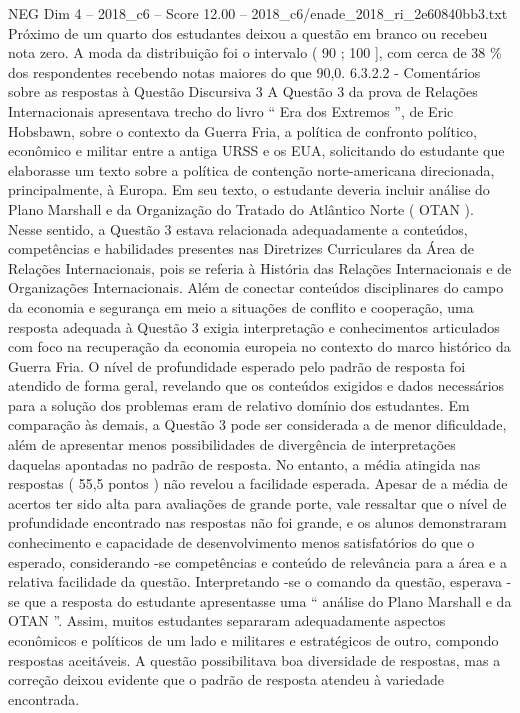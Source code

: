 \begin{textsample}{NEG Dim 4 – 2018\_c6 – Score 12.00 – 2018\_c6/enade\_2018\_ri\_2e60840bb3.txt}
Próximo de um quarto dos estudantes deixou a questão em branco ou recebeu nota zero.
A moda da distribuição foi o intervalo ( 90 ; 100 ], com cerca de 38 \% dos respondentes recebendo notas maiores do que 90,0. 6.3.2.2 - Comentários sobre as respostas à Questão Discursiva 3 A Questão 3 da prova de Relações Internacionais apresentava trecho do livro “ Era dos Extremos ”, de Eric Hobsbawn, sobre o contexto da Guerra Fria, a política de confronto político, econômico e militar entre a antiga URSS e os EUA, solicitando do estudante que elaborasse um texto sobre a política de contenção norte-americana direcionada, principalmente, à Europa.
Em seu texto, o estudante deveria incluir análise do Plano Marshall e da Organização do Tratado do Atlântico Norte ( OTAN ).
Nesse sentido, a Questão 3 estava relacionada adequadamente a conteúdos, competências e habilidades presentes nas Diretrizes Curriculares da Área de Relações Internacionais, pois se referia à História das Relações Internacionais e de Organizações Internacionais.
Além de conectar conteúdos disciplinares do campo da economia e segurança em meio a situações de conflito e cooperação, uma resposta adequada à Questão 3 exigia interpretação e conhecimentos articulados com foco na recuperação da economia europeia no contexto do marco histórico da Guerra Fria.
O nível de profundidade esperado pelo padrão de resposta foi atendido de forma geral, revelando que os conteúdos exigidos e dados necessários para a solução dos problemas eram de relativo domínio dos estudantes.
Em comparação às demais, a Questão 3 pode ser considerada a de menor dificuldade, além de apresentar menos possibilidades de divergência de interpretações daquelas apontadas no padrão de resposta.
No entanto, a média atingida nas respostas ( 55,5 pontos ) não revelou a facilidade esperada.
Apesar de a média de acertos ter sido alta para avaliações de grande porte, vale ressaltar que o nível de profundidade encontrado nas respostas não foi grande, e os alunos demonstraram conhecimento e capacidade de desenvolvimento menos satisfatórios do que o esperado, considerando -se competências e conteúdo de relevância para a área e a relativa facilidade da questão.
Interpretando -se o comando da questão, esperava -se que a resposta do estudante apresentasse uma “ análise do Plano Marshall e da OTAN ”.
Assim, muitos estudantes separaram adequadamente aspectos econômicos e políticos de um lado e militares e estratégicos de outro, compondo respostas aceitáveis.
A questão possibilitava boa diversidade de respostas, mas a correção deixou evidente que o padrão de resposta atendeu à variedade encontrada.

\end{textsample}
